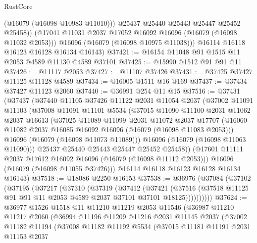 \begin{lexlean}{RustCore}
\begin{coremodule}
              (@16079 (@16098 @10983 @11010)))
            @25437
            @25440
            @25443
            @25447
            @25452
            @25458))
        (@17041 @11031 @2037 @17052 @16092 @16096 (@16079 (@16098 @11032 @2053)))
        @16096
        (@16079 (@16098 @10975 @11038)))
      @16114
      @16118
      @16123
      @16128
      @16134
      @16143)
@37421 := @16154 @11048 @91 @1515 @11 @2053 @4589 @11130 @4589 @37101
@37425 := @15990 @1512 @91 @91 @11
@37426 := @11117 @2053
@37427 := @11107 @37426
@37431 := @37425 @37427 @11125 @11128 @4589
@37434 := @16005 @1511 @16 @169
@37437 := @37434 @37427 @11123 @2060
@37440 := @36991 @254 @11 @15
@37516 := @37431
    (@37437
      (@37440
        @11105
        @37426
        @11122
        @2031
        @11054
        @2037
        (@37002
          @11091
          @11103
          (@37008
            @11091
            @11101
            @5534
            (@37015
              @11090
              @11100
              @2031
              @11062
              @2037
              @16613
              (@37025
                @11089
                @11099
                @2031
                @11072
                @2037
                @17707
                (@16060 @11082 @2037 @16085 @16092 @16096 (@16079 (@16098 @11083 @2053)))
                @16096
                (@16079 (@16098 @11073 @11089)))
              @16096
              (@16079 (@16098 @11063 @11090)))
            @25437
            @25440
            @25443
            @25447
            @25452
            @25458))
        (@17601 @11111 @2037 @17612 @16092 @16096 (@16079 (@16098 @11112 @2053)))
        @16096
        (@16079 (@16098 @11055 @37426)))
      @16114
      @16118
      @16123
      @16128
      @16134
      @16143)
@37518 := @18086 @2250 @16153
@37538 := @36976
    (@37084
      (@37102
        (@37195
          (@37217
            (@37310
              (@37319
                (@37412
                  (@37421
                    (@37516
                      (@37518 @11125 @91 @91 @11 @2053 @4589 @2037 @37101 @37101 @18125))))))))))
@37624 := @36977
    @1526
    @1518
    @11
    @11210
    @11219
    @2053
    @11546
    (@36987
      @11210
      @11217
      @2060
      (@36994
        @11196
        @11209
        @11216
        @2031
        @11145
        @2037
        (@37002
          @11182
          @11194
          (@37008
            @11182
            @11192
            @5534
            (@37015
              @11181
              @11191
              @2031
              @11153
              @2037

\end{coremodule}
\end{lexlean}
